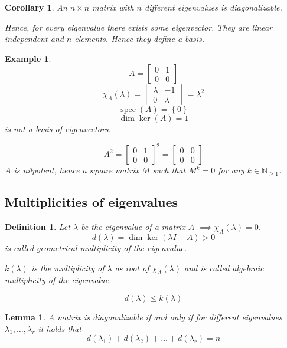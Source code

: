 \documentclass{article}
\newtheorem{example}{Example}  \numberwithin{example}{section}
\newtheorem{definition}{Definition}  \numberwithin{definition}{section}
\newtheorem{lemma}{Lemma}  \numberwithin{lemma}{section}
\newtheorem*{corollary}{Corollary}%
\newcommand{\set}[1]{\left\{#1\right\}}
\begin{document}
\begin{corollary} %
  An $n\times n$ matrix with $n$ different eigenvalues is diagonalizable.

  Hence, for every eigenvalue there exists some eigenvector. They are linear independent and $n$ elements.
  Hence they define a basis.
\end{corollary}

\begin{example} %
  \[ A = \begin{bmatrix} 0 & 1 \\ 0 & 0 \end{bmatrix} \]
  \[ \chi_A(\lambda) = \begin{vmatrix} \lambda & -1 \\ 0 & \lambda \end{vmatrix} = \lambda^2 \]
  \[ \operatorname{spec}(A) = \set{0} \]
  \[ \dim\ker(A) = 1 \]
  is not a basis of eigenvectors.

  \[ A^2 = \begin{bmatrix} 0 & 1 \\ 0 & 0 \end{bmatrix}^2 = \begin{bmatrix} 0 & 0 \\ 0 & 0 \end{bmatrix} \]
  $A$ is nilpotent, hence a square matrix $M$ such that $M^k = 0$ for any $k \in \mathbb N_{\geq1}$.
\end{example}

\subsection{Multiplicities of eigenvalues}

\begin{definition} %
  Let $\lambda$ be the eigenvalue of a matrix $A$ $\implies \chi_A(\lambda) = 0$.
  \[ d(\lambda) = \dim\ker(\lambda I - A) > 0 \]
  is called \emph{geometrical multiplicity of the eigenvalue}.

  $k(\lambda)$ is the multiplicity of $\lambda$ as root of $\chi_A(\lambda)$
  and is called \emph{algebraic multiplicity of the eigenvalue}.

  \[ d(\lambda) \leq k(\lambda) \]
\end{definition}

\begin{lemma} %
  A matrix is diagonalizable if and only if for different eigenvalues $\lambda_1, \dots, \lambda_r$ it holds that
  \[ d(\lambda_1) + d(\lambda_2) + \dots + d(\lambda_r) = n \]
\end{lemma}
\end{document}
